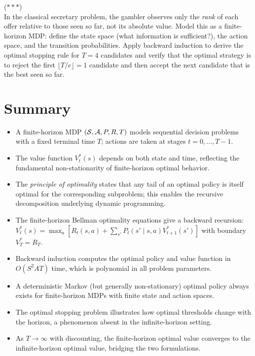 \documentclass[11pt,a4paper]{article}
\begin{document}
\begin{exercise} \textnormal{(\(***\))} \\
In the classical secretary problem, the gambler observes only the
\emph{rank} of each offer relative to those seen so far, not its
absolute value. Model this as a finite-horizon MDP: define the state
space (what information is sufficient?), the action space, and the
transition probabilities. Apply backward induction to derive the
optimal stopping rule for $T = 4$ candidates and verify that the
optimal strategy is to reject the first $\lfloor T/e \rfloor = 1$
candidate and then accept the next candidate that is the best seen
so far.
\end{exercise}


\section{Summary}
\label{sec:summary}

\begin{itemize}
    \item A finite-horizon MDP $(\mathcal{S}, \mathcal{A}, P, R, T)$ models
    sequential decision problems with a fixed terminal time $T$;
    actions are taken at stages $t = 0, \ldots, T-1$.
    \item The value function $V_t^*(s)$ depends on both state and
    time, reflecting the fundamental non-stationarity of finite-horizon
    optimal behavior.
    \item The \emph{principle of optimality} states that any tail of
    an optimal policy is itself optimal for the corresponding
    subproblem; this enables the recursive decomposition underlying
    dynamic programming.
    \item The finite-horizon Bellman optimality equations give a
    backward recursion:
    $V_t^*(s) = \max_a [R_t(s,a) + \sum_{s'} P_t(s' \mid s,a)
    V_{t+1}^*(s')]$ with boundary $V_T^* = R_T$.
    \item Backward induction computes the optimal policy and value
    function in $O(S^2 A T)$ time, which is polynomial in all
    problem parameters.
    \item A deterministic Markov (but generally non-stationary)
    optimal policy always exists for finite-horizon MDPs with finite
    state and action spaces.
    \item The optimal stopping problem illustrates how optimal
    thresholds change with the horizon, a phenomenon absent in the
    infinite-horizon setting.
    \item As $T \to \infty$ with discounting, the finite-horizon
    optimal value converges to the infinite-horizon optimal value,
    bridging the two formulations.
\end{itemize}
\end{document}
